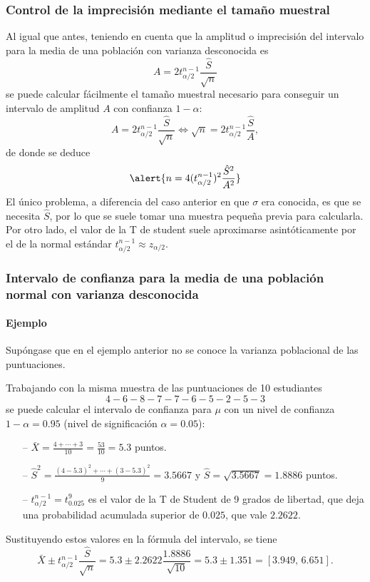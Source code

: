 \begin{frame}
\frametitle{Control de la imprecisión mediante el tamaño muestral}
Al igual que antes, teniendo en cuenta que la amplitud o imprecisión del intervalo para la media de una población con varianza desconocida es
\[
A= 2 t^{n-1}_{\alpha/2}\frac{\hat{S}}{\sqrt{n}}
\]
se puede calcular fácilmente el tamaño muestral necesario para conseguir un intervalo de amplitud $A$ con confianza $1-\alpha$:
\[
A= 2 t^{n-1}_{\alpha/2}\frac{\hat{S}}{\sqrt{n}} \Leftrightarrow \sqrt{n}= 2 t^{n-1}_{\alpha/2}\frac{\hat{S}}{A},
\]
de donde se deduce
\[
\alert{n = 4 (t^{n-1}_{\alpha/2})^2\frac{\hat{S}^2}{A^2}}
\]
El único problema, a diferencia del caso anterior en que $\sigma$ era conocida, es que se necesita $\hat{S}$, por lo
que se suele tomar una muestra pequeña previa para calcularla. Por otro lado, el valor de la T de student suele
aproximarse asintóticamente por el de la normal estándar $t^{n-1}_{\alpha/2}\approx z_{\alpha/2}$.
\end{frame}


\begin{frame}
\frametitle{Intervalo de confianza para la media de una población normal con varianza desconocida}
\framesubtitle{Ejemplo}
Supóngase que en el ejemplo anterior no se conoce la varianza poblacional de las puntuaciones.

Trabajando con la misma muestra de las puntuaciones de 10 estudiantes
\[
4 - 6 - 8 - 7 - 7 - 6 - 5 - 2 - 5 - 3
\]
se puede calcular el intervalo de confianza para $\mu$ con un nivel de confianza $1-\alpha=0.95$ (nivel de significación $\alpha=0.05$):
\begin{itemize}
\item[--] $\bar X = \frac{4+\cdots+3}{10}= \frac{53}{10} = 5.3$ puntos.
\item[--] $\hat{S}^2= \frac{(4-5.3)^2+\cdots+(3-5.3)^2}{9} = 3.5667$ y $\hat{S}=\sqrt{3.5667}=1.8886$ puntos.
\item[--] $t^{n-1}_{\alpha/2}=t^9_{0.025}$ es el valor de la T de Student de 9 grados de libertad, que deja una probabilidad acumulada
superior de $0.025$, que vale $2.2622$.
\end{itemize}
Sustituyendo estos valores en la fórmula del intervalo, se tiene
\[
\bar{X}\pm t^{n-1}_{\alpha/2}\frac{\hat{S}}{\sqrt{n}} = 5.3\pm 2.2622\frac{1.8886}{\sqrt{10}} = 5.3\pm 1.351 = \left[3.949,\,6.651\right].
\]
\end{frame}


